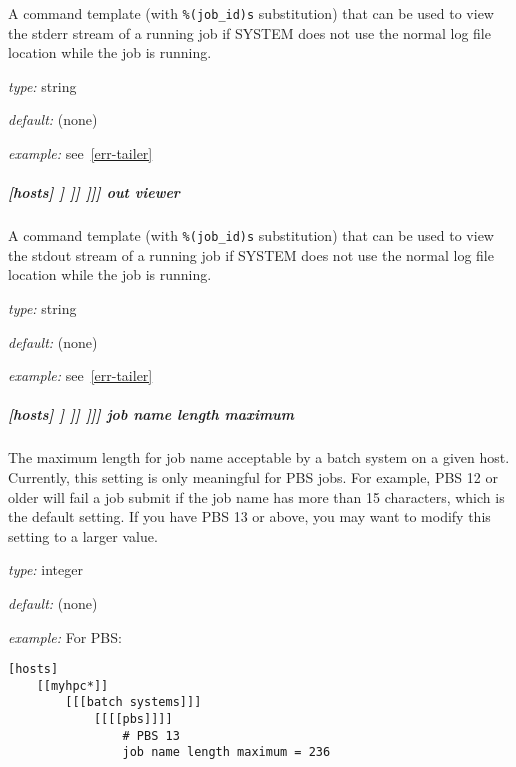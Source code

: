 A command template (with \lstinline=%(job_id)s= substitution) that can be used
to view the stderr stream of a running job if SYSTEM does
not use the normal log file location while the job is running.

\begin{myitemize}
\item {\em type:} string
\item {\em default:} (none)
\item {\em example:} see~\ref{err-tailer}
\end{myitemize}

\subparagraph[{[[[[}SYSTEM{]]]]}out viewer]{[hosts] \textrightarrow [[HOST]] \textrightarrow [[[batch systems]]] \textrightarrow [[[[SYSTEM]]]] \textrightarrow out viewer}

A command template (with \lstinline=%(job_id)s= substitution) that can be used
to view the stdout stream of a running job if SYSTEM does
not use the normal log file location while the job is running.

\begin{myitemize}
\item {\em type:} string
\item {\em default:} (none)
\item {\em example:} see~\ref{err-tailer}
\end{myitemize}

\subparagraph[{[[[[}SYSTEM{]]]]}job name length maximum]{[hosts] \textrightarrow [[HOST]] \textrightarrow [[[batch systems]]] \textrightarrow [[[[SYSTEM]]]] \textrightarrow job name length maximum}
\label{JobNameLengthMaximum}

The maximum length for job name acceptable by a batch system on a given host.
Currently, this setting is only meaningful for PBS jobs. For example, PBS 12
or older will fail a job submit if the job name has more than 15 characters,
which is the default setting. If you have PBS 13 or above, you may want to
modify this setting to a larger value.

\begin{myitemize}
\item {\em type:} integer
\item {\em default:} (none)
\item {\em example:}  For PBS:
    \begin{lstlisting}
[hosts]
    [[myhpc*]]
        [[[batch systems]]]
            [[[[pbs]]]]
                # PBS 13
                job name length maximum = 236
    \end{lstlisting}
\end{myitemize}

